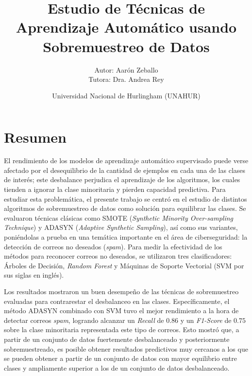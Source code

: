\documentclass[a4paper,11pt ,openany]{book}
\title{Estudio de Técnicas de Aprendizaje Automático usando Sobremuestreo de Datos}
\author{Autor: Aarón Zeballo  \\ Tutora: Dra. Andrea Rey}
\date{Universidad Nacional de Hurlingham (UNAHUR)}
\renewcommand{\listfigurename}{\'Indice de Figuras}
\renewcommand{\listtablename}{\'Indice de Tablas}
\begin{document}
\maketitle


	\tableofcontents
	
	\renewcommand{\listfigurename}{Índice de Figuras}
	\listoffigures
	
    \renewcommand{\listtablename}{Índice de Tablas}
	\listoftables



\chapter*{Resumen}

El rendimiento de los modelos de aprendizaje automático supervisado puede verse afectado por el desequilibrio de la cantidad de ejemplos en cada una de las clases de interés; este desbalance perjudica el aprendizaje de los algoritmos, los cuales tienden a ignorar la clase minoritaria y pierden capacidad predictiva. Para estudiar esta problemática, el presente trabajo se centró en el estudio de distintos algoritmos de sobremuestreo de datos como solución para equilibrar las clases. Se evaluaron técnicas clásicas como SMOTE (\textit{Synthetic Minority Over-sampling Technique}) y ADASYN (\textit{Adaptive Synthetic Sampling}), así como sus variantes, poniéndolas a prueba en una temática importante en el área de ciberseguridad: la detección de correos no deseados (\textit{spam}). Para medir la efectividad de los métodos para reconocer correos no deseados, se utilizaron tres clasificadores: Árboles de Decisión, \textit{Random Forest} y Máquinas de Soporte Vectorial (SVM por sus siglas en inglés).

Los resultados mostraron un buen desempeño de las técnicas de sobremuestreo evaluadas para contrarestar el desbalanceo en las clases. Específicamente, el método ADASYN combinado con SVM tuvo el mejor rendimiento a la hora de detectar correos \textit{spam}, logrando alcanzar un \textit{Recall} de $0.86$ y un \textit{F1-Score} de $0.75$ sobre la clase minoritaria representada este tipo de correos. Esto mostró que, a partir de un conjunto de datos fuertemente desbalanceado y posteriormente sobremuestreado, es posible obtener resultados predictivos muy cercanos a los que se pueden obtener a partir de un conjunto de datos con mayor equilibrio entre clases y ampliamente superior a los de un conjunto de datos desbalanceado.
\end{document}
